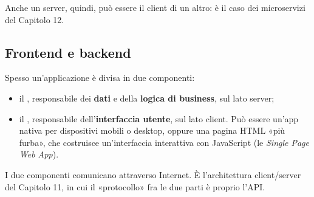 \begin{center}
\end{center}

Anche un server, quindi, può essere il client di un altro: è il caso dei microservizi del Capitolo 12.

\subsection{Frontend e backend}

Spesso un'applicazione è divisa in due componenti:
\begin{itemize}
  \item il , responsabile dei \textbf{dati} e della \textbf{logica di business}, sul lato server;
  \item il , responsabile dell'\textbf{interfaccia utente}, sul lato client. Può essere un'app nativa per
        dispositivi mobili o desktop, oppure una pagina HTML «più furba», che costruisce un'interfaccia interattiva con
        JavaScript (le \textit{Single Page Web App}).
\end{itemize}
I due componenti comunicano attraverso Internet. È l'architettura client/server del Capitolo 11, in cui il «protocollo»
fra le due parti è proprio l'API.

